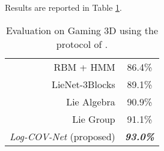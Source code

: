 \documentclass[10pt,twocolumn]{article}
\begin{document}
Results are reported in Table \ref{tab:G3D}.

\begin{table}[h!]
	\centering
	\begin{tabular}{|rc|}
	\hline
	RBM + HMM \cite{RBMHMM} & 86.4\% \\
	LieNet-3Blocks \cite{deeplie} & 89.1\% \\
	Lie Algebra \cite{Vemulapalli:CVPR16} & 90.9\% \\
	Lie Group \cite{Vemulapalli:CVPR14} & 91.1\% \\ \hline \hline
	\textit{Log-COV-Net} (proposed) & \textbf{\textit{93.0\%}} \\ \hline
\end{tabular}\vspace{5pt}
\caption{Evaluation on Gaming 3D using the protocol of \cite{Vemulapalli:CVPR16}.}
\label{tab:G3D}
\end{table}
\end{document}

